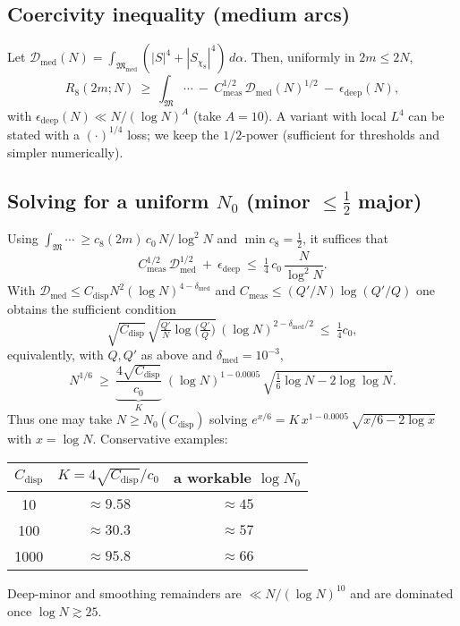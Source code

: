 \documentclass[11pt]{article}
\theoremstyle{definition}
\theoremstyle{remark}
\begin{document}
\subsection*{Coercivity inequality (medium arcs)}
Let $\mathcal D_{\mathrm{med}}(N)=\int_{\mathfrak M_{\mathrm{med}}}(|S|^4+|S_{\chi_8}|^4)\,d\alpha$. Then, uniformly in $2m\le 2N$,
\[
  R_8(2m;N)\ \ge\ \int_{\mathfrak M}\cdots\ -\ C_{\mathrm{meas}}^{1/2}\,\mathcal D_{\mathrm{med}}(N)^{1/2}\ -\ \epsilon_{\mathrm{deep}}(N),
\]
with $\epsilon_{\mathrm{deep}}(N)\ll N/(\log N)^{A}$ (take $A=10$). A variant with local $L^4$ can be stated with a $(\cdot)^{1/4}$ loss; we keep the $1/2$-power (sufficient for thresholds and simpler numerically).

\subsection*{Solving for a uniform $N_0$ (minor $\le \tfrac12$ major)}
Using $\int_{\mathfrak M}\cdots\ \ge c_8(2m)\,c_0\,N/\log^2N$ and $\min c_8=\tfrac12$, it suffices that
\[
 C_{\mathrm{meas}}^{1/2}\,\mathcal D_{\mathrm{med}}^{1/2}\ +\ \epsilon_{\mathrm{deep}}\ \le\ \tfrac14\,c_0\,\frac{N}{\log^2 N}.
\]
With $\mathcal D_{\mathrm{med}}\le C_{\mathrm{disp}}N^2(\log N)^{4-\delta_{\mathrm{med}}}$ and $C_{\mathrm{meas}}\le (Q'/N)\log(Q'/Q)$ one obtains the sufficient condition
\[
  \sqrt{C_{\mathrm{disp}}}\,\sqrt{\tfrac{Q'}{N}\log\!\big(\tfrac{Q'}{Q}\big)}\,(\log N)^{2-\delta_{\mathrm{med}}/2}\ \le\ \tfrac14 c_0,
\]
equivalently, with $Q,Q'$ as above and $\delta_{\mathrm{med}}=10^{-3}$,
\[
  N^{1/6}\ \ge\ \underbrace{\frac{4\sqrt{C_{\mathrm{disp}}}}{c_0}}_{\displaystyle K}\; (\log N)^{1-0.0005}\,\sqrt{\tfrac16\log N-2\log\log N}.
\]
Thus one may take $N\ge N_0(C_{\mathrm{disp}})$ solving $e^{x/6}=K\,x^{1-0.0005}\,\sqrt{x/6-2\log x}$ with $x=\log N$. Conservative examples:
\begin{center}
\begin{tabular}{c|c|c}
$C_{\mathrm{disp}}$ & $K=4\sqrt{C_{\mathrm{disp}}}/c_0$ & a workable $\log N_0$ \\
\hline
10 & $\approx 9.58$ & $\approx 45$ \\
100 & $\approx 30.3$ & $\approx 57$ \\
1000 & $\approx 95.8$ & $\approx 66$ \\
\end{tabular}
\end{center}
Deep-minor and smoothing remainders are $\ll N/(\log N)^{10}$ and are dominated once $\log N\gtrsim 25$.
\end{document}
